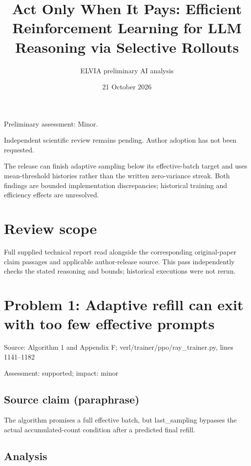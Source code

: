 \documentclass[11pt]{article}
\begin{document}
\title{Act Only When It Pays: Efficient Reinforcement Learning for LLM Reasoning via Selective Rollouts}

\author{ELVIA preliminary AI analysis}\date{21 October 2026}\maketitle

Preliminary assessment: Minor.\par

Independent scientific review remains pending. Author adoption has not been requested.

The release can finish adaptive sampling below its effective-batch target and uses mean-threshold histories rather than the written zero-variance streak. Both findings are bounded implementation discrepancies; historical training and efficiency effects are unresolved.

\section*{Review scope}

Full supplied technical report read alongside the corresponding original-paper claim passages and applicable author-release source. This pass independently checks the stated reasoning and bounds; historical executions were not rerun.

\section*{Problem 1: Adaptive refill can exit with too few effective prompts}

Source: Algorithm 1 and Appendix F; verl/trainer/ppo/ray\_trainer.py, lines 1141–1182

Assessment: supported; impact: minor

\subsection*{Source claim (paraphrase)}

The algorithm promises a full effective batch, but last\_sampling bypasses the actual accumulated-count condition after a predicted final refill.

\subsection*{Analysis}
\end{document}
